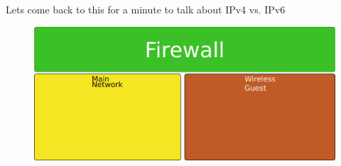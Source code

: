 \begin{frame}
	{Lets come back to this for a minute to talk about IPv4 vs. IPv6}
	\begin{figure}[H]
		\centering
        \includegraphics[width=\linewidth]{IMAGES/Network-Basic}
	\end{figure}

\end{frame}

\cprotect\note{
}


